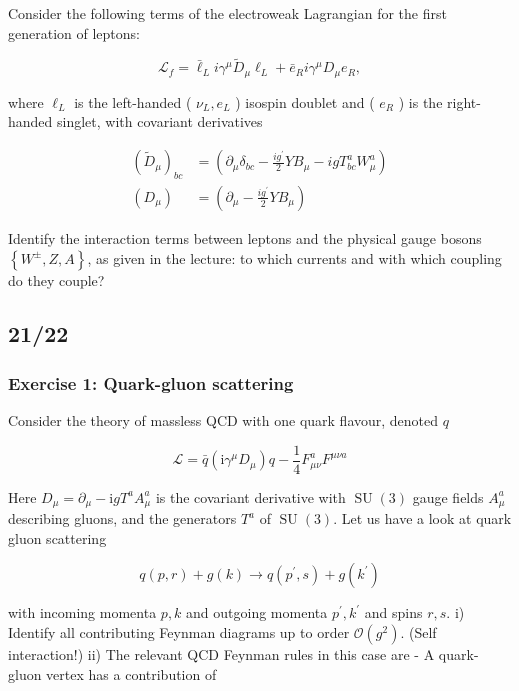 \documentclass[10pt, letterpaper]{article}
\begin{document}
Consider the following terms of the electroweak Lagrangian for the first generation of leptons:

$$
\mathcal{L}_f=\bar{\ell}_L i \gamma^\mu \widetilde{D}_\mu \ell_L+\bar{e}_R i \gamma^\mu D_\mu e_R,
$$

where $\ell_L$ is the left-handed ( $\nu_L, e_L$ ) isospin doublet and ( $e_R$ ) is the right-handed singlet, with covariant derivatives

$$
\begin{aligned}
\left(\widetilde{D}_\mu\right)_{b c} & =\left(\partial_\mu \delta_{b c}-\frac{i g^{\prime}}{2} Y B_\mu-i g T_{b c}^a W_\mu^a\right) \\
\left(D_\mu\right) & =\left(\partial_\mu-\frac{i g^{\prime}}{2} Y B_\mu\right)
\end{aligned}
$$


Identify the interaction terms between leptons and the physical gauge bosons $\left\{W^{ \pm}, Z, A\right\}$, as given in the lecture: to which currents and with which coupling do they couple?


\pagebreak


\subsection{21/22}


\subsubsection{Exercise 1: Quark-gluon scattering}
Consider the theory of massless QCD with one quark flavour, denoted $q$

$$
\mathcal{L}=\bar{q}\left(\mathrm{i} \gamma^\mu D_\mu\right) q-\frac{1}{4} F_{\mu \nu}^a F^{\mu \nu a}
$$


Here $D_\mu=\partial_\mu-\mathrm{i} g T^a A_\mu^a$ is the covariant derivative with $\operatorname{SU}(3)$ gauge fields $A_\mu^a$ describing gluons, and the generators $T^a$ of $\operatorname{SU}(3)$.
Let us have a look at quark gluon scattering

$$
q(p, r)+g(k) \rightarrow q\left(p^{\prime}, s\right)+g\left(k^{\prime}\right)
$$

with incoming momenta $p, k$ and outgoing momenta $p^{\prime}, k^{\prime}$ and spins $r, s$.
i) Identify all contributing Feynman diagrams up to order $\mathcal{O}\left(g^2\right)$. (Self interaction!)
ii) The relevant QCD Feynman rules in this case are
- A quark-gluon vertex has a contribution of
\end{document}
